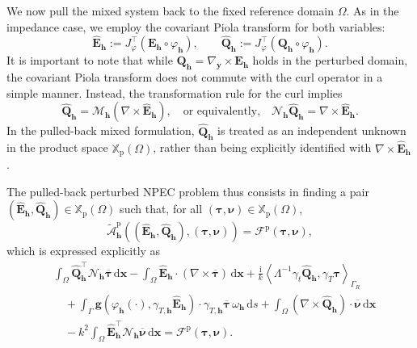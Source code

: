 \documentclass[12pt,reqno]{amsart}
\theoremstyle{definition}
\numberwithin{equation}{section}
\begin{document}
We now pull the mixed system back to the fixed reference domain $\Omega$. As in the impedance case, we employ the covariant Piola transform for both variables:
\[
\hat{\mathbf{E}}_{\mathbf{h}} := J_\varphi^\top(\mathbf{E}_{\mathbf{h}} \circ \varphi_{\mathbf{h}}), \qquad \hat{\mathbf{Q}}_{\mathbf{h}} := J_\varphi^\top(\mathbf{Q}_{\mathbf{h}} \circ \varphi_{\mathbf{h}}).
\]
It is important to note that while $\mathbf{Q}_{\mathbf{h}} = \nabla_{\boldsymbol{y}} \times \mathbf{E}_{\mathbf{h}}$ holds in the perturbed domain, the covariant Piola transform does not commute with the curl operator in a simple manner. Instead, the transformation rule for the curl implies
\[
\hat{\mathbf{Q}}_{\mathbf{h}} = \mathcal{M}_{\mathbf{h}} (\nabla \times \hat{\mathbf{E}}_{\mathbf{h}}), \quad \text{or equivalently,} \quad \mathcal{N}_{\mathbf{h}} \hat{\mathbf{Q}}_{\mathbf{h}} = \nabla \times \hat{\mathbf{E}}_{\mathbf{h}}.
\]
In the pulled-back mixed formulation, $\hat{\mathbf{Q}}_{\mathbf{h}}$ is treated as an independent unknown in the product space $\mathbb{X}_{\mathrm{p}}(\Omega)$, rather than being explicitly identified with $\nabla \times \hat{\mathbf{E}}_{\mathbf{h}}$.

The pulled-back perturbed NPEC problem thus consists in finding a pair $(\hat{\mathbf{E}}_{\mathbf{h}}, \hat{\mathbf{Q}}_{\mathbf{h}}) \in \mathbb{X}_{\mathrm{p}}(\Omega)$ such that, for all $(\boldsymbol{\tau}, \boldsymbol{\nu}) \in \mathbb{X}_{\mathrm{p}}(\Omega)$,
\[
\widetilde{\mathcal{A}}^{\mathrm{p}}_{\mathbf{h}} \left( (\hat{\mathbf{E}}_{\mathbf{h}}, \hat{\mathbf{Q}}_{\mathbf{h}}), (\boldsymbol{\tau}, \boldsymbol{\nu}) \right) = \mathcal{F}^{\mathrm{p}}(\boldsymbol{\tau}, \boldsymbol{\nu}),
\]
which is expressed explicitly as
\[
\begin{aligned}
&\int_\Omega \hat{\mathbf{Q}}_{\mathbf{h}}^{\top} \mathcal{N}_{\mathbf{h}} \overline{\boldsymbol{\tau}} \,\mathrm{d}\boldsymbol{x} - \int_\Omega \hat{\mathbf{E}}_{\mathbf{h}} \cdot (\nabla \times \overline{\boldsymbol{\tau}}) \,\mathrm{d}\boldsymbol{x} + \frac{\mathrm{i}}{k} \left\langle \Lambda^{-1} \gamma_t \hat{\mathbf{Q}}_{\mathbf{h}}, \gamma_T \boldsymbol{\tau} \right\rangle_{\Gamma_R} \\
&\quad +\int_\Gamma \mathbf{g}(\varphi_{\mathbf{h}}(\cdot), \gamma_{T,\mathbf{h}} \hat{\mathbf{E}}_{\mathbf{h}}) \cdot \gamma_{T,\mathbf{h}} \overline{\boldsymbol{\tau}} \, \omega_{\mathbf{h}} \,\mathrm{d}s + \int_\Omega (\nabla \times \hat{\mathbf{Q}}_{\mathbf{h}}) \cdot \overline{\boldsymbol{\nu}} \,\mathrm{d}\boldsymbol{x} \\
&\quad - k^2 \int_\Omega \hat{\mathbf{E}}_{\mathbf{h}}^{\top} \mathcal{N}_{\mathbf{h}} \overline{\boldsymbol{\nu}} \,\mathrm{d}\boldsymbol{x} = \mathcal{F}^{\mathrm{p}}(\boldsymbol{\tau}, \boldsymbol{\nu}).
\end{aligned}
\]
\end{document}
